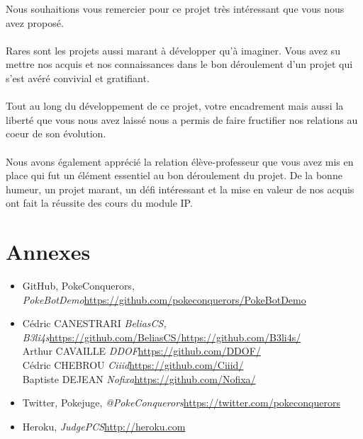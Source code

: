 \documentclass[12pt]{article}
\begin{document}
Nous souhaitions vous remercier pour ce projet très intéressant que vous nous avez proposé. \\\\Rares sont les projets aussi marant à développer qu'à imaginer. Vous avez su mettre nos acquis et nos connaissances dans le bon déroulement d'un projet qui s'est avéré convivial et gratifiant.\\\\ Tout au long du développement de ce projet, votre encadrement mais aussi la liberté que vous nous avez laissé nous a permis de faire fructifier nos relations au coeur de son évolution.\\\\Nous avons également apprécié la relation élève-professeur que vous avez mis en place qui fut un élément essentiel au bon déroulement du projet. De la bonne humeur, un projet marant, un défi intéressant et la mise en valeur de nos acquis ont fait la réussite des cours du module IP.

\newpage
\section{Annexes}
\begin{itemize}
	\item GitHub, PokeConquerors, \textit{PokeBotDemo}\subitem\url{https://github.com/pokeconquerors/PokeBotDemo}\\
	\item Cédric CANESTRARI \textit{BeliasCS, B3li4s}\subitem\url{https://github.com/BeliasCS/}\subitem\url{https://github.com/B3li4s/}\\
		 Arthur CAVAILLE \textit{DDOF}\subitem\url{https://github.com/DDOF/}\\
		 Cédric CHEBROU \textit{Ciiid}\subitem\url{https://github.com/Ciiid/}\\
		 Baptiste DEJEAN \textit{Nofixa}\subitem\url{https://github.com/Nofixa/}\\
	\item Twitter, Pokejuge, \textit{@PokeConquerors}\subitem\url{https://twitter.com/pokeconquerors}\\
	\item Heroku, \textit{JudgePCS}\subitem\url{http://heroku.com}\\
	
\end{itemize}
\end{document}
